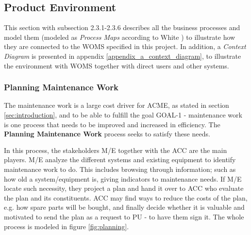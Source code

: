 \subsection{Product Environment}
\label{sec:product_environment}
This section with subsection 2.3.1-2.3.6 describes all the business processes and model them (modeled as \emph{Process Maps} according to White \cite{bpmn}) to illustrate how they are connected to the WOMS specified in this project. In addition, a \emph{Context Diagram} is presented in appendix \ref{appendix_a_context_diagram}, to illustrate the environment with WOMS together with direct users and other systems. 
\subsubsection{Planning Maintenance Work}
\label{sec:bp1}
The maintenance work is a large cost driver for ACME, as stated in section \ref{sec:introduction}, and to be able to fulfill the goal GOAL-1 - maintenance work is one process that needs to be improved and increased in efficiency. The \textbf{Planning Maintenance Work} process seeks to satisfy these needs. 

In this process, the stakeholders M/E together with the ACC are the main players. M/E analyze the different systems and existing equipment to identify maintenance work to do. This includes browsing through information; such as how old a system/equipment is, giving indicators to maintenance needs. If M/E locate such necessity, they project a plan and hand it over to ACC who evaluate the plan and its constituents. ACC may find ways to reduce the costs of the plan, e.g. how spare parts will be bought, and finally decide whether it is valuable and motivated to send the plan as a request to PU - to have them sign it. The whole process is modeled in figure \ref{fig:planning}.

